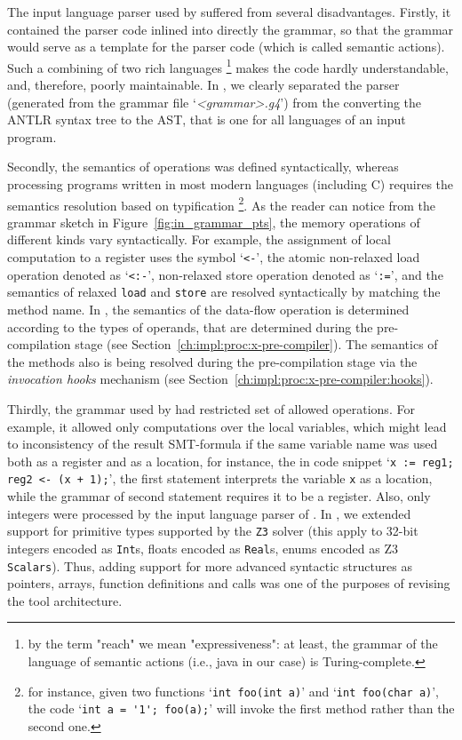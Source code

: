 The input language parser used by \porthos[1] suffered from several disadvantages.
Firstly, it contained the parser code inlined into directly the grammar, so that the grammar would serve as a template for the parser code (which is called semantic actions). Such a combining of two rich languages%
\footnote{by the term "reach" we mean "expressiveness": at least, the grammar of the language of semantic actions (i.e., java in our case) is Turing-complete.} %
makes the code hardly understandable, and, therefore, poorly maintainable. In \porthos[2], we clearly separated the parser (generated from the grammar file `\textit{<grammar>.g4}') from the converting the ANTLR syntax tree to the AST, that is one for all  languages of an input program.

Secondly, the semantics of operations was defined syntactically, whereas processing programs written in most modern languages (including C) requires the semantics resolution based on typification%
\footnote{for instance, given two functions
`\lstinline{int foo(int a)}' and `\lstinline{int foo(char a)}', the code `\lstinline{int a = '1'; foo(a);}' will invoke the first method rather than the second one.}.%
As the reader can notice from the grammar sketch in Figure~\ref{fig:in_grammar_pts}, the memory operations of different kinds vary syntactically. For example, the assignment of local computation to a register uses the symbol `\lstinline{<-}', the atomic non-relaxed load operation denoted as `\lstinline{<:-}', non-relaxed store operation denoted as `\lstinline{:=}', and the semantics of relaxed \lstinline{load} and \lstinline{store} are resolved syntactically by matching the method name. In \porthos[2], the semantics of the data-flow operation is determined according to the types of operands, that are determined during the pre-compilation stage (see Section~\ref{ch:impl:proc:x-pre-compiler}). The semantics of the methods also is being resolved during the pre-compilation stage via the \textit{invocation hooks} mechanism (see Section~\ref{ch:impl:proc:x-pre-compiler:hooks}).

Thirdly, the grammar used by \porthos{} had restricted set of allowed operations. For example, it allowed only computations over the local variables, which might lead to inconsistency of the result SMT-formula if the same variable name was used both as a register and as a location, for instance, the in code snippet `\lstinline{x := reg1; reg2 <- (x + 1);}', the first statement interprets the variable \lstinline{x} as a location, while the grammar of second statement requires it to be a register. Also, only integers were processed by the input language parser of \porthos[1]. In \porthos[2], we extended support for primitive types supported by the \texttt{Z3} solver (this apply to 32-bit integers encoded as \texttt{Int}s, floats encoded as \texttt{Real}s, enums encoded as Z3 \texttt{Scalars}).
Thus, adding support for more advanced syntactic structures as pointers, arrays, function definitions and calls was one of the purposes of revising the tool architecture.

